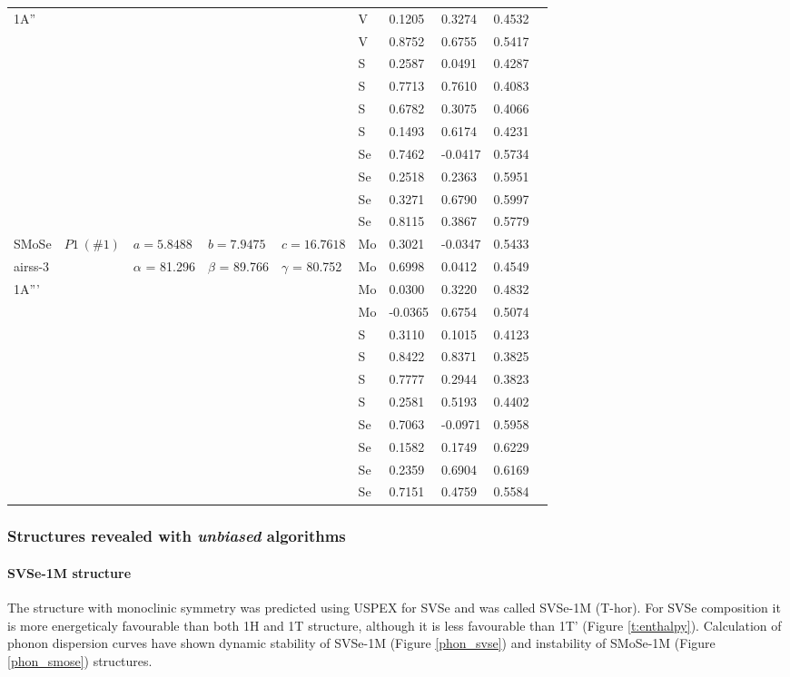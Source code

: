 \documentclass[a4paperm]{article}
\begin{document}
\begin{longtable}[c]{l*{9}{l}}
		1A''&&&&&	V	&	0.1205	&	0.3274	&	0.4532	\\
		&&&&&	V	&	0.8752	&	0.6755	&	0.5417	\\
		&&&&&	S	&	0.2587	&	0.0491	&	0.4287	\\
		&&&&&	S	&	0.7713	&	0.7610	&	0.4083	\\
		&&&&&	S	&	0.6782	&	0.3075	&	0.4066	\\
		&&&&&	S	&	0.1493	&	0.6174	&	0.4231	\\
		&&&&&	Se	&	0.7462	&	-0.0417	&	0.5734	\\
		&&&&&	Se	&	0.2518	&	0.2363	&	0.5951	\\
		&&&&&	Se	&	0.3271	&	0.6790	&	0.5997	\\
		&&&&&	Se	&	0.8115	&	0.3867	&	0.5779	\\
		\hline
		SMoSe & $P1\ (\#1)$  &	$a=5.8488$ & $b=7.9475$ & $c=16.7618$  & Mo	&	0.3021	&	-0.0347	&	0.5433	\\
		airss-3&&$\alpha$ = 81.296& $\beta$ = 89.766& $\gamma$ = 80.752  & Mo	&	0.6998	&	0.0412	&	0.4549	\\		
		1A'''&&&&&	Mo	&	0.0300	&	0.3220	&	0.4832	\\
		&&&&&	Mo	&	-0.0365	&	0.6754	&	0.5074	\\
		&&&&&	S	&	0.3110	&	0.1015	&	0.4123	\\
		&&&&&	S	&	0.8422	&	0.8371	&	0.3825	\\
		&&&&&	S	&	0.7777	&	0.2944	&	0.3823	\\
		&&&&&	S	&	0.2581	&	0.5193	&	0.4402	\\
		&&&&&	Se	&	0.7063	&	-0.0971	&	0.5958	\\
		&&&&&	Se	&	0.1582	&	0.1749	&	0.6229	\\
		&&&&&	Se	&	0.2359	&	0.6904	&	0.6169	\\
		&&&&&	Se	&	0.7151	&	0.4759	&	0.5584	\\
		\hline
	\end{longtable}



\subsubsection{Structures revealed with {\it unbiased} algorithms}
\paragraph{SVSe-1M structure}

The structure with monoclinic symmetry was predicted using USPEX for SVSe and was called SVSe-1M (T-hor). 
For SVSe composition it is more  energeticaly favourable than both 1H and 1T structure, although it is less favourable than 1T' (Figure \ref{t:enthalpy}).
Calculation of phonon dispersion curves have shown dynamic stability of SVSe-1M (Figure \ref{phon_svse}) and instability of SMoSe-1M (Figure \ref{phon_smose}) structures.
\end{document}
